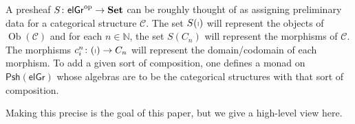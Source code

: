 \documentclass[11pt, article, oneside]{memoir}
\theoremstyle{plain}
\theoremstyle{definition}
\theoremstyle{remark}
\newcommand{\cat}[1]{\mathcal{#1}}
\newcommand{\Cat}[1]{\mathbf{#1}}
\newcommand{\Fun}[1]{\mathsf{#1}}
\DeclareMathOperator{\id}{id}
\DeclareMathOperator{\Ob}{Ob}
\newcommand{\op}{^\tn{op}}
\newcommand{\NN}{\mathbb{N}}
\newcommand{\tn}[1]{\textnormal{#1}}
\newcommand{\Psh}{\Fun{Psh}}
\newcommand{\SmSet}{\Cat{Set}}
\newcommand{\dtodo}[2][]{\todo[linecolor=white, backgroundcolor=white, bordercolor=gray, #1]{#2}}
\newcommand{\stodo}[2][]{\todo[color=red!30, #1]{#2}}
\newcommand\el{\mathsf{elGr}}
\newcommand\g{\mathcal G}
\newcommand\cc{\mathcal C}
\newcommand{\esG}[1][\mathcal{G}]{\ensuremath{\mathsf{es}{(#1)}}}
\newcommand\stick{\shortmid}
\begin{document}
A presheaf $S\colon \el\op \to \SmSet$ can be roughly thought of as assigning preliminary data for a categorical structure $\cat{C}$. The set $S(\stick)$ will represent the objects of $\Ob(\cat{C})$ and for each $n\in\NN$, the set $S(C_n)$ will represent the morphisms of $\cat{C}$. The morphisms $c^n_i\colon(\stick)\to C_n$ will represent the domain/codomain of each morphism. To add a given sort of composition, one defines a monad on $\Psh(\el)$ whose algebras are to be the categorical structures with that sort of composition.

Making this precise is the goal of this paper, but we give a high-level view here.
\dtodo{Fill in}

%
 

%
%
%
%
\end{document}
